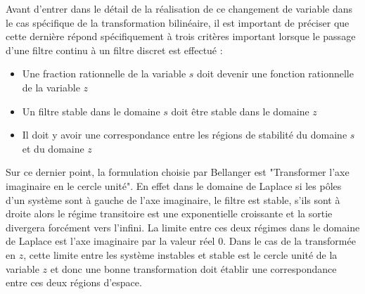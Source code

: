 \documentclass[11pt,a4paper]{article}
\begin{document}
Avant d'entrer dans le détail de la réalisation de ce changement de variable dans le cas spécifique de la transformation bilinéaire, il est important de préciser que cette dernière répond spécifiquement à trois critères important lorsque le passage d'une filtre continu à un filtre discret est effectué : \\

\begin{itemize}
\item Une fraction rationnelle de la variable $s$ doit devenir une fonction rationnelle de la variable $z$
\item Un filtre stable dans le domaine $s$ doit être stable dans le domaine $z$
\item Il doit y avoir une correspondance entre les régions de stabilité du domaine $s$ et du domaine $z$
\end{itemize}

Sur ce dernier point, la formulation choisie par Bellanger est "Transformer l’axe imaginaire en le cercle unité". En effet dans le domaine de Laplace si les pôles d'un système sont à gauche de l'axe imaginaire, le filtre est stable, s'ils sont à droite alors le régime transitoire est une exponentielle croissante et la sortie divergera forcément vers l'infini. La limite entre ces deux régimes dans le domaine de Laplace est l'axe imaginaire par la valeur réel 0. Dans le cas de la transformée en $z$, cette limite entre les système instables et stable est le cercle unité de la variable $z$ et donc une bonne transformation doit établir une correspondance entre ces deux régions d'espace.

 
\end{document}
